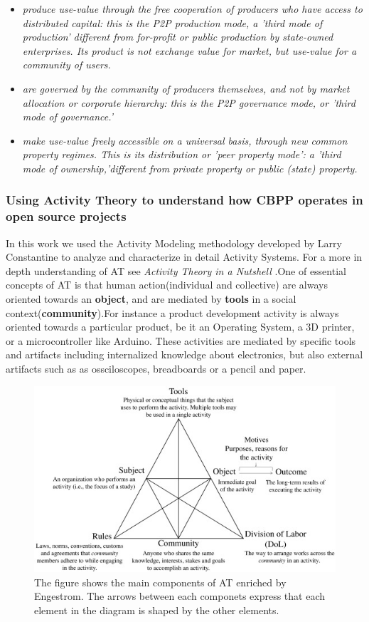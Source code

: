 \documentclass{ICED-Paper}%
\begin{document}
\begin{itemize}
  \item \emph{produce use-value through the free cooperation of producers who have access to distributed capital: this is the P2P production mode, a 'third mode of production' different from for-profit or public production by state-owned enterprises. Its product is not exchange value for market, but use-value for a community of users.}
  \item \emph{are governed by the community of producers themselves, and not by market allocation or corporate hierarchy: this is the P2P governance mode, or 'third mode of governance.'}
  \item \emph{make use-value freely accessible on a universal basis, through new common property regimes. This is its distribution or 'peer property mode': a 'third mode of ownership,'different from private property or public (state) property.}
\end{itemize}

\subsubsection{Using Activity Theory to understand how CBPP operates in open source projects}
In this work we used the Activity Modeling methodology developed by Larry Constantine to analyze and characterize in detail Activity Systems\cite{Constantine}. For a more in depth understanding of AT see \emph{Activity Theory in a Nutshell} \cite{ATnuthsell}.One of essential concepts of AT is that human action(individual and collective) are always oriented towards an \textbf{object}, and are mediated by \textbf{tools} in a social context(\textbf{community}).For instance a product development activity is always oriented towards a particular product, be it an Operating System, a 3D printer, or a microcontroller like Arduino. These activities are mediated by specific tools and artifacts including internalized knowledge about electronics, but also external artifacts such as as ossciloscopes, breadboards or a pencil and paper.

\begin{figure}
\includegraphics[width=\linewidth,height=\textheight,keepaspectratio]{AT.jpg}
\caption{\label{fig1}The figure shows the main components of AT enriched by Engestrom\cite{}. The arrows between each componets express that each element in the diagram is shaped by the other elements.}
\end{figure}
\bigskip
\end{document}
